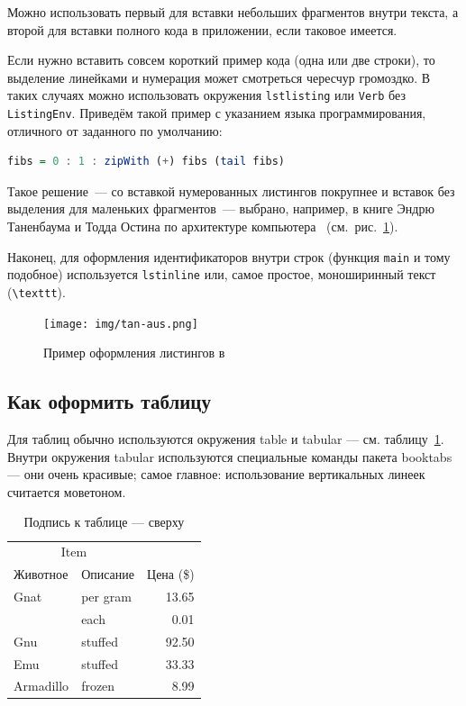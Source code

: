Можно использовать первый для вставки небольших фрагментов
внутри текста, а второй для вставки полного
кода в приложении, если таковое имеется.

Если нужно вставить совсем короткий пример кода (одна или две строки), то выделение  линейками и нумерация может смотреться чересчур громоздко. В таких случаях можно использовать окружения \texttt{lstlisting} или \texttt{Verb} без \texttt{ListingEnv}. Приведём такой пример с указанием языка программирования, отличного от заданного по умолчанию:
\begin{lstlisting}[language=Haskell]
fibs = 0 : 1 : zipWith (+) fibs (tail fibs)
\end{lstlisting}
Такое решение~--- со вставкой нумерованных листингов покрупнее
и вставок без выделения для маленьких фрагментов~--- выбрано,
например, в книге Эндрю Таненбаума и Тодда Остина по архитектуре
компьютера~\autocite{TanAus2013} (см.~рис.~\ref{fig:tan-aus}).

Наконец, для оформления идентификаторов внутри строк
(функция \lstinline{main} и тому подобное) используется
\texttt{lstinline} или, самое простое, моноширинный текст
(\texttt{\textbackslash texttt}).

\begin{figure}[p]%
\centering
\texttt{[image: img/tan-aus.png]}
\caption{\label{fig:tan-aus}Пример оформления листингов в~\autocite{TanAus2013}}
\end{figure}

\subsection{Как оформить таблицу}

Для таблиц обычно используются окружения table и tabular --- см. таблицу~\ref{tab:widgets}. Внутри окружения tabular используются специальные команды пакета booktabs — они очень красивые; самое главное: использование вертикальных линеек считается моветоном.

\begin{table}
\centering
\caption{\label{tab:widgets}Подпись к таблице --- сверху}
\begin{tabular}{llr}
\toprule
\multicolumn{2}{c}{Item} \\
\cmidrule(r){1-2}
Животное  & Описание    & Цена (\$) \\
\midrule
Gnat      & per gram    & 13.65      \\
          & each        & 0.01       \\
Gnu       & stuffed     & 92.50      \\
Emu       & stuffed     & 33.33      \\
Armadillo & frozen      & 8.99       \\
\bottomrule
\end{tabular}
\end{table}

